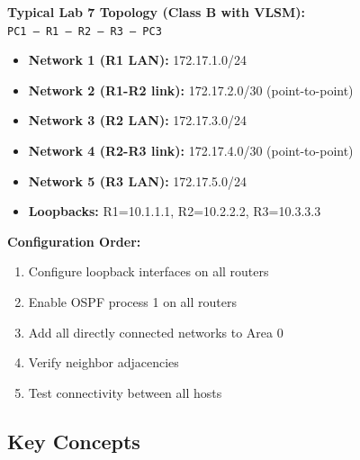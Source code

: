 \documentclass[12pt,a4paper]{article}
\begin{document}
\begin{center}
\begin{tcolorbox}[colback=light,colframe=primary,width=0.95\textwidth]
\textbf{Typical Lab 7 Topology (Class B with VLSM):}\\[0.2cm]
\texttt{PC1 --- R1 --- R2 --- R3 --- PC3}\\[0.3cm]
\begin{itemize}[noitemsep]
    \item \textbf{Network 1 (R1 LAN):} 172.17.1.0/24
    \item \textbf{Network 2 (R1-R2 link):} 172.17.2.0/30 (point-to-point)
    \item \textbf{Network 3 (R2 LAN):} 172.17.3.0/24
    \item \textbf{Network 4 (R2-R3 link):} 172.17.4.0/30 (point-to-point)
    \item \textbf{Network 5 (R3 LAN):} 172.17.5.0/24
    \item \textbf{Loopbacks:} R1=10.1.1.1, R2=10.2.2.2, R3=10.3.3.3
\end{itemize}

\vspace{0.2cm}
\textbf{Configuration Order:}
\begin{enumerate}[noitemsep]
    \item Configure loopback interfaces on all routers
    \item Enable OSPF process 1 on all routers
    \item Add all directly connected networks to Area 0
    \item Verify neighbor adjacencies
    \item Test connectivity between all hosts
\end{enumerate}
\end{tcolorbox}
\end{center}

\subsection{Key Concepts}
\end{document}
